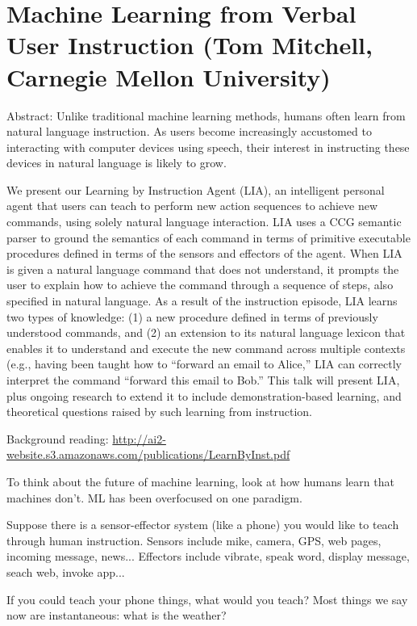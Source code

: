 \section{Machine Learning from Verbal User Instruction (Tom Mitchell, Carnegie Mellon University)}

Abstract: 
Unlike traditional machine learning methods, humans often learn from natural language instruction. As users become increasingly accustomed to interacting with computer devices using speech, their interest in instructing these devices in natural language is likely to grow.

We present our Learning by Instruction Agent (LIA), an intelligent personal agent that users can teach to perform new action sequences to achieve new commands, using solely natural language interaction. LIA uses a CCG semantic parser to ground the semantics of each command in terms of primitive executable procedures defined in terms of the sensors and effectors of the agent. When LIA is given a natural language command that does not understand, it prompts the user to explain how to achieve the command through a sequence of steps, also specified in natural language. As a result of the instruction episode, LIA learns two types of knowledge: (1) a new procedure defined in terms of previously understood commands, and (2) an extension to its natural language lexicon that enables it to understand and execute the new command across multiple contexts (e.g., having been taught how to ``forward an email to Alice,'' LIA can correctly interpret the command ``forward this email to Bob.'' This talk will present LIA, plus ongoing research to extend it to include demonstration-based learning, and theoretical questions raised by such learning from instruction.

Background reading: \url{http://ai2-website.s3.amazonaws.com/publications/LearnByInst.pdf}

To think about the future of machine learning, look at how humans learn that machines don't. ML has been overfocused on one paradigm.

Suppose there is a sensor-effector system (like a phone) you would like to teach through human instruction. Sensors include mike, camera, GPS, web pages, incoming message, news... Effectors include vibrate, speak word, display message, seach web, invoke app... 

If you could teach your phone things, what would you teach? Most things we say now are instantaneous: what is the weather?

